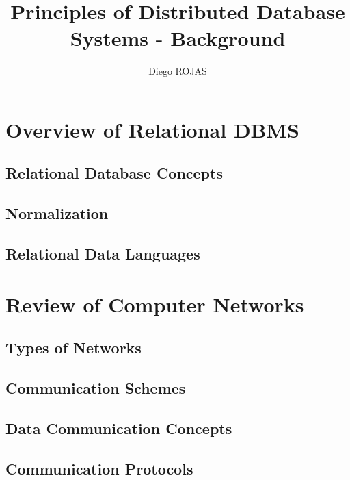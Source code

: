 \documentclass[12pt]{article}
\title{Principles of Distributed Database Systems - Background}
\author{Diego ROJAS}
\begin{document}
\maketitle

\section{Overview of Relational DBMS}

\subsection{Relational Database Concepts}

\subsection{Normalization}

\subsection{Relational Data Languages}

\section{Review of Computer Networks}

\subsection{Types of Networks}

\subsection{Communication Schemes}

\subsection{Data Communication Concepts}

\subsection{Communication Protocols}
\end{document}
